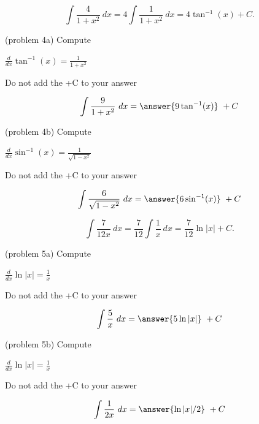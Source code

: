 \documentclass[handout]{ximera}
\begin{document}
\begin{example}[example 4]
\[
\int \frac{4}{1+x^2} \ dx = 4 \int \frac{1}{1+x^2} \ dx = 4\tan^{-1}(x) +C.
\]
\end{example}



\begin{problem}(problem 4a)
Compute

\begin{hint}
$\frac{d}{dx} \tan^{-1}(x) = \frac{1}{1+x^2}$
\end{hint}
\begin{hint}
Do not add the +C to your answer
\end{hint}

\[
\int \frac{9}{1+x^2} \ dx =
\answer{9\tan^{-1}(x)} \ +  C
\]
\end{problem}

\begin{problem}(problem 4b)
Compute

\begin{hint}
$\frac{d}{dx} \sin^{-1}(x) = \frac{1}{\sqrt{1-x^2}}$
\end{hint}
\begin{hint}
Do not add the +C to your answer
\end{hint}

\[
\int \frac{6}{\sqrt{1-x^2}} \ dx =
\answer{6\sin^{-1}(x)} \ +  C
\]
\end{problem}


\begin{example}[example 5]
\[
\int \frac{7}{12x} \ dx = \frac{7}{12} \int \frac{1}{x} \ dx = \frac{7}{12} \ln|x| +C.
\]
\end{example}


\begin{problem}(problem 5a)
Compute

\begin{hint}
$\frac{d}{dx} \ln|x| = \frac{1}{x}$
\end{hint}
\begin{hint}
Do not add the +C to your answer
\end{hint}

\[
\int \frac{5}{x} \ dx =
\answer{5\ln|x|} \ +  C
\]
\end{problem}

\begin{problem}(problem 5b)
Compute

\begin{hint}
$\frac{d}{dx} \ln|x| = \frac{1}{x}$
\end{hint}
\begin{hint}
Do not add the +C to your answer
\end{hint}

\[
\int \frac{1}{2x} \ dx =
\answer{\ln|x| /2} \ +  C
\]
\end{problem}
\end{document}

